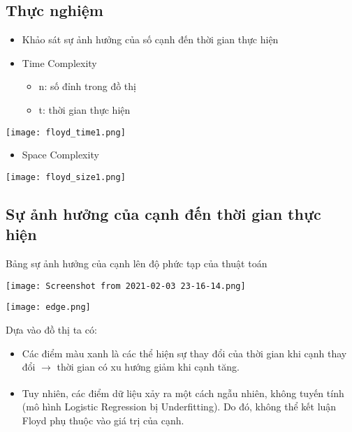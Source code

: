 \documentclass[a4paper]{article}
\begin{document}
\subsection{Thực nghiệm}

\begin{itemize}
    \item Khảo sát sự ảnh hưởng của số cạnh đến thời gian thực hiện
\end{itemize}

\begin{itemize}
    \item Time Complexity
    
    \begin{itemize}
        \item n: số đỉnh trong đồ thị
        \item t: thời gian thực hiện
    \end{itemize}

\end{itemize}

\begin{center}
    \texttt{[image: floyd\_time1.png]}
\end{center}

\begin{itemize}
    \item Space Complexity
\end{itemize}
\begin{center}
    \texttt{[image: floyd\_size1.png]}
\end{center}

\subsection{Sự ảnh hưởng của cạnh đến thời gian thực hiện}
Bảng sự ảnh hưởng của cạnh lên độ phức tạp của thuật toán

\begin{center}
    \texttt{[image: Screenshot from 2021-02-03 23-16-14.png]}
\end{center}

\begin{center}
    \texttt{[image: edge.png]}
\end{center}
Dựa vào đồ thị ta có:
\begin{itemize}
    \item Các điểm màu xanh là các thể hiện sự thay đổi của thời gian khi cạnh thay đổi $\xrightarrow[ ]{}$ thời gian có xu hướng giảm khi cạnh tăng.
 \item Tuy nhiên, các điểm dữ liệu xảy ra một cách ngẫu nhiên, không tuyến tính (mô hình Logistic Regression bị Underfitting). Do đó, không thể kết luận Floyd phụ thuộc vào giá trị của cạnh.
\end{itemize}
\end{document}
